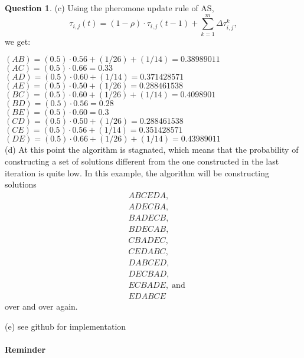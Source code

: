 \documentclass[11pt,a4paper]{article}
\theoremstyle{definition}%
\newtheorem{Q}{Question}[] %
\begin{document}
\begin{Q}
{    (c) Using the pheromone update rule of AS, 
    $$\tau_{i,j}(t)= (1-\rho)\cdot\tau_{i,j}(t-1)+ \sum_{k=1}^{m} \Delta\tau_{i,j}^k,$$ we get:

	 $(AB) = (0.5)\cdot0.56 + (1/26)+(1/14) = 0.38989011$\\
	 $(AC) = (0.5)\cdot0.66 = 0.33$\\
	 $(AD) = (0.5)\cdot0.60 + (1/14) = 0.371428571$\\
	 $(AE) = (0.5)\cdot0.50 + (1/26) = 0.288461538$\\
	 $(BC) = (0.5)\cdot0.60 + (1/26)+(1/14) = 0.4098901$\\
	 $(BD) = (0.5)\cdot0.56 = 0.28$\\
	 $(BE) = (0.5)\cdot0.60 = 0.3 $\\
	 $(CD) = (0.5)\cdot0.50 + (1/26) = 0.288461538$\\
	 $(CE) = (0.5)\cdot0.56 + (1/14) = 0.351428571$\\
	 $(DE) = (0.5)\cdot0.66 + (1/26)+(1/14) = 0.43989011$\\
     
    (d)
	At this point the algorithm is stagnated, which means that the probability of 
    constructing a set of solutions different from the one constructed in the last 
    iteration is quite low. In this example, the algorithm will be constructing solutions
     	$$
     	\begin{aligned}
     		&ABCEDA, \\
     		&ADECBA, \\
     		&BADECB, \\
     		&BDECAB, \\
     		&CBADEC, \\
     		&CEDABC, \\
     		&DABCED, \\
     		&DECBAD, \\
     		&ECBADE, \;\mathrm{and}\\
     		&EDABCE
     	\end{aligned}
     	$$
     	over and over again.

        (e) see github for implementation
 }

 \end{Q}

\clearpage
\paragraph{Reminder}
\end{document}
